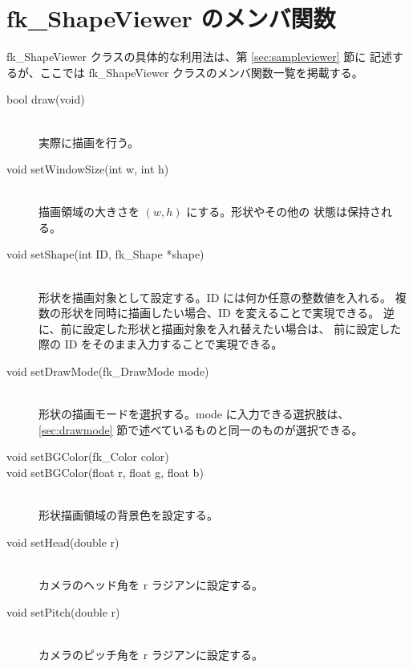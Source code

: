 \section{fk\_ShapeViewer のメンバ関数}
fk\_ShapeViewer クラスの具体的な利用法は、第 \ref{sec:sampleviewer} 節に
記述するが、ここでは fk\_ShapeViewer クラスのメンバ関数一覧を掲載する。
\begin{description}
 \item[\hspace*{0.6cm}bool draw(void)] ~ \\
	実際に描画を行う。

 \item[\hspace*{0.6cm}void setWindowSize(int w, int h)] ~ \\
	描画領域の大きさを \((w, h)\) にする。形状やその他の
	状態は保持される。

 \item[\hspace*{0.6cm}void setShape(int ID, fk\_Shape *shape)] ~ \\
	形状を描画対象として設定する。ID には何か任意の整数値を入れる。
	複数の形状を同時に描画したい場合、ID を変えることで実現できる。
	逆に、前に設定した形状と描画対象を入れ替えたい場合は、
	前に設定した際の ID をそのまま入力することで実現できる。

 \item[\hspace*{0.6cm}void setDrawMode(fk\_DrawMode mode)] ~ \\
	形状の描画モードを選択する。mode に入力できる選択肢は、
	\ref{sec:drawmode} 節で述べているものと同一のものが選択できる。

 \item[\hspace*{0.6cm}void setBGColor(fk\_Color color)]
 \item[\hspace*{0.6cm}void setBGColor(float r, float g, float b)] ~ \\
	形状描画領域の背景色を設定する。

 \item[\hspace*{0.6cm}void setHead(double r)] ~ \\
	カメラのヘッド角を r ラジアンに設定する。

 \item[\hspace*{0.6cm}void setPitch(double r)] ~ \\
	カメラのピッチ角を r ラジアンに設定する。


\end{description}
